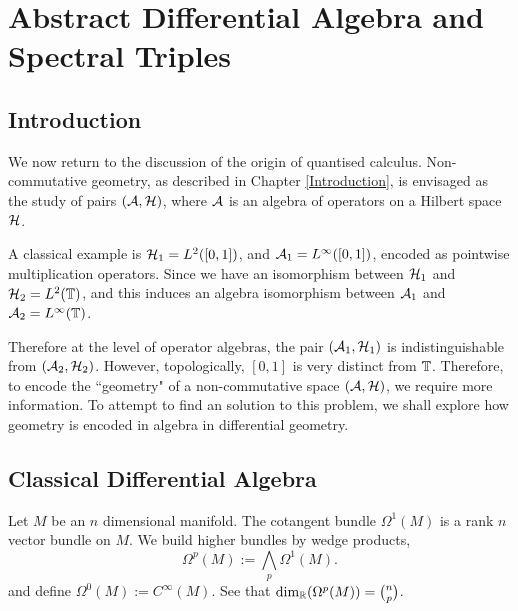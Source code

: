 
\chapter{Abstract Differential Algebra and Spectral Triples} %

\label{AbstractDifferentialAlgebra} %




\section{Introduction}
We now return to the discussion of the origin of quantised calculus. Non-commutative
geometry, as described in Chapter \ref{Introduction}, is envisaged
as the study of pairs $(\mathcal{A},\mathcal{H})$, where $\mathcal{A}$ is an algebra
of operators on a Hilbert space $\mathcal{H}$.

A classical example is $\mathcal{H}_1 = L^2([0,1])$, and $\mathcal{A}_1 = L^\infty([0,1])$,
encoded as pointwise multiplication operators. 
Since we have an isomorphism between $\mathcal{H}_1$ and $\mathcal{H}_2 = L^2(\mathbb{T})$, and
this induces an algebra isomorphism between $\mathcal{A}_1$ and $\mathcal{A}_2 = L^\infty(\mathbb{T})$.

Therefore at the level of operator algebras, the pair $(\mathcal{A}_1,\mathcal{H}_1)$ is indistinguishable
from $(\mathcal{A}_2,\mathcal{H}_2)$. However, topologically, $[0,1]$ is very distinct
from $\mathbb{T}$. Therefore, to encode the ``geometry" of a non-commutative
space $(\mathcal{A},\mathcal{H})$, we require more information. To attempt to find
an solution to this problem, we shall explore how geometry is encoded
in algebra in differential geometry.

\section{Classical Differential Algebra}
Let $M$ be an $n$ dimensional manifold. The cotangent bundle $\Omega^1(M)$
is a rank $n$ vector bundle on $M$. We build higher bundles by wedge products,
\begin{equation*}
    \Omega^p(M) := \bigwedge_p \Omega^1(M).
\end{equation*}
and define $\Omega^0(M) := C^\infty(M)$. See that $\dim_{\mathbb{R}}(\Omega^p(M)) = \binom{n}{p}$.


